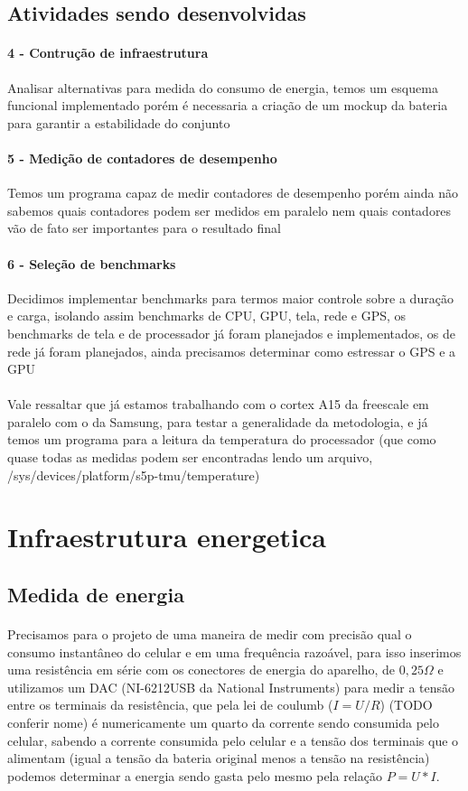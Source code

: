 \documentclass[11pt,a4paper,titlepage]{article}
\begin{document}
\subsection{Atividades sendo desenvolvidas}
\paragraph{4 - Contrução de infraestrutura} Analisar alternativas para medida do 
consumo de energia, temos um esquema funcional implementado porém é necessaria a criação de um mockup da bateria para garantir a estabilidade do conjunto 
\paragraph{5 - Medição de contadores de desempenho} Temos um programa capaz de medir contadores de desempenho porém ainda não sabemos quais contadores podem ser medidos em paralelo nem quais contadores vão de fato ser importantes para o resultado final
\paragraph{6 - Seleção de benchmarks} Decidimos implementar benchmarks para termos maior controle sobre a duração e carga, isolando assim benchmarks de CPU, GPU, tela, rede e GPS, os benchmarks de tela e de processador já foram planejados e implementados, os de rede já foram planejados, ainda precisamos determinar como estressar o GPS e a GPU
\paragraph{} Vale ressaltar que já estamos trabalhando com o cortex A15 da freescale em paralelo com o da Samsung, para testar a generalidade da metodologia, e já temos um programa para a leitura da temperatura do processador (que como quase todas as medidas podem ser encontradas lendo um arquivo, /sys/devices/platform/s5p-tmu/temperature)
\section{Infraestrutura energetica}
\subsection{Medida de energia} 
\paragraph{} Precisamos para o projeto de uma maneira de medir com precisão qual o consumo instantâneo do celular e em uma frequência razoável, para isso inserimos uma resistência em série com os conectores de energia do aparelho, de $0,25\Omega$ e utilizamos um DAC (NI-6212USB da National Instruments) para medir a tensão entre os terminais da resistência, que pela lei de coulumb ($I=U/R$) (TODO conferir nome) é numericamente um quarto da corrente sendo consumida pelo celular, sabendo a corrente consumida pelo celular e a tensão dos terminais que o alimentam (igual a tensão da bateria original menos a tensão na resistência) podemos determinar a energia sendo gasta pelo mesmo pela relação $P=U*I$.
\end{document}
